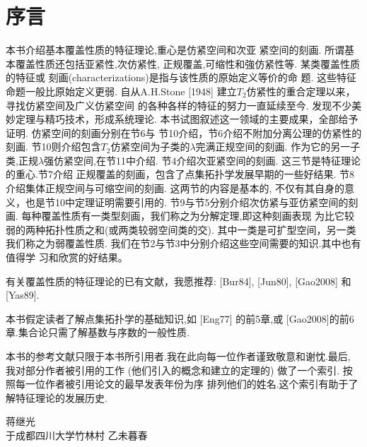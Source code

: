 \chapter*{序\quad 言}

\setcounter{page}{1}
\thispagestyle{empty}

本书介绍基本覆盖性质的特征理论,重心是仿紧空间和次亚
紧空间的刻画.
所谓基本覆盖性质还包括亚紧性,次仿紧性,
正规覆盖,可缩性和強仿紧性等.
某类覆盖性质的特征或
刻画(characterizations)是指与该性质的原始定义等价的命
题.
这些特征命题一般比原始定义更弱.
自从A.H.Stone [1948]
建立$T_2$仿紧性的重合定理以来，寻找仿紧空间及广义仿紧空间
的各种各样的特征的努力一直延续至今.
发现不少美妙定理与精巧技术，形成系统理论.
本书试图叙述这一领域的主要成果，全部给予证明.
仿紧空间的刻画分别在节6与
节10介绍，节6介绍不附加分离公理的仿紧性的刻画.
节10则介绍包含$T_2$仿紧空间为子类的$\lambda$完满正规空间的刻画.
作为它的另一子类,正规$\lambda$强仿紧空间,在节11中介绍.
节4介绍次亚紧空间的刻画.
这三节是特征理论的重心.节7介绍
正规覆盖的刻画，包含了点集拓扑学发展早期的一些好结果.
节8介绍集体正规空间与可缩空间的刻画.
这两节的内容是基本的, 不仅有其自身的意义，也是节10中定理证明需要引用的.
节9与节5分别介绍次仿紧与亚仿紧空间的刻画.
每种覆盖性质有一类型刻画，我们称之为分解定理,即这种刻画表现
为比它较弱的两种拓扑性质之和(或两类较弱空间类的交).
其中一类是可扩型空间，另一类我们称之为弱覆盖性质.
我们在节2与节3中分别介绍这些空间需要的知识.其中也有值得学
习和欣赏的好结果。

有关覆盖性质的特征理论的已有文献，我愿推荐: [Bur84], [Jun80], [Gao2008] 和 [Yas89].

本书假定读者了解点集拓扑学的基础知识,如 [Eng77] 的前5章,或
[Gao2008]的前6章.集合论只需了解基数与序数的一般性质.

本书的参考文献只限于本书所引用者.我在此向每一位作者谨致敬意和谢忱.最后, 我对部分作者被引用的工作 (他们引入的概念和建立的定理的) 做了一个索引.
按照每一位作者被引用论文的最早发表年份为序
排列他们的姓名.这个索引有助于了解特征理论的发展历史.

{\kaishu
	\begin{center}
		\hspace*{88mm}蒋继光\\
		\hspace{88mm}于成都四川大学竹林村
		\hspace*{88mm}乙未暮春
	\end{center}
}


